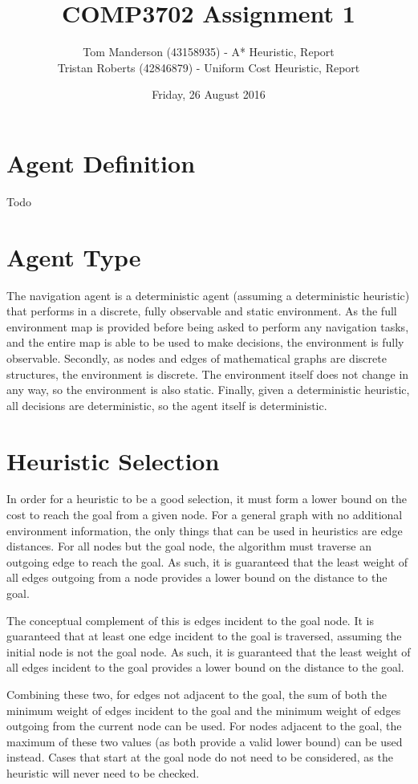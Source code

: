 \documentclass[11pt,a4paper]{article}
\title{COMP3702 Assignment 1}
\author{
Tom Manderson (43158935) - A* Heuristic, Report
\\
Tristan Roberts (42846879) - Uniform Cost Heuristic, Report
}
\date{Friday, 26 August 2016}
\begin{document}
\maketitle
\tableofcontents
\clearpage

\section{Agent Definition}
Todo


\section{Agent Type}
The navigation agent is a deterministic agent (assuming a deterministic heuristic) that performs in a discrete, fully observable and static environment. As the full environment map is provided before being asked to perform any navigation tasks, and the entire map is able to be used to make decisions, the environment is fully observable. Secondly, as nodes and edges of mathematical graphs are discrete structures, the environment is discrete. The environment itself does not change in any way, so the environment is also static. Finally, given a deterministic heuristic, all decisions are deterministic, so the agent itself is deterministic.


\section{Heuristic Selection}
In order for a heuristic to be a good selection, it must form a lower bound on the cost to reach the goal from a given node. For a general graph with no additional environment information, the only things that can be used in heuristics are edge distances. For all nodes but the goal node, the algorithm must traverse an outgoing edge to reach the goal. As such, it is guaranteed that the least weight of all edges outgoing from a node provides a lower bound on the distance to the goal.

The conceptual complement of this is edges incident to the goal node. It is guaranteed that at least one edge incident to the goal is traversed, assuming the initial node is not the goal node. As such, it is guaranteed that the least weight of all edges incident to the goal provides a lower bound on the distance to the goal.

Combining these two, for edges not adjacent to the goal, the sum of both the minimum weight of edges incident to the goal and the minimum weight of edges outgoing from the current node can be used. For nodes adjacent to the goal, the maximum of these two values (as both provide a valid lower bound) can be used instead. Cases that start at the goal node do not need to be considered, as the heuristic will never need to be checked.
\end{document}
